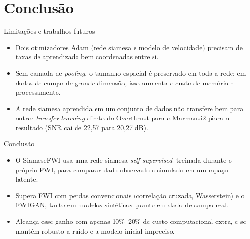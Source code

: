 \section{Conclusão}

\begin{frame}{Limitações e trabalhos futuros}
	\begin{itemize}
		\item Dois otimizadores Adam (rede siamesa e modelo de velocidade) precisam de taxas de aprendizado bem coordenadas entre si.
		\item Sem camada de \textit{pooling}, o tamanho espacial é preservado em toda a rede: em dados de campo de grande dimensão, isso aumenta o custo de memória e processamento.
		\item A rede siamesa aprendida em um conjunto de dados não transfere bem para outro: \textit{transfer learning} direto do Overthrust para o Marmousi2 piora o resultado (SNR cai de 22,57 para 20,27 dB).
	\end{itemize}
\end{frame}

\begin{frame}{Conclusão}
	\begin{itemize}
		\item O SiameseFWI usa uma rede siamesa \textit{self-supervised}, treinada durante o próprio FWI, para comparar dado observado e simulado em um espaço latente.
		\item Supera FWI com perdas convencionais (correlação cruzada, Wasserstein) e o FWIGAN, tanto em modelos sintéticos quanto em dado de campo real.
		\item Alcança esse ganho com apenas 10\%--20\% de custo computacional extra, e se mantém robusto a ruído e a modelo inicial impreciso.
	\end{itemize}
\end{frame}
